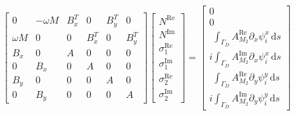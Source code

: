 \documentclass[11pt,a4paper]{article}
\begin{document}
\begin{equation}
\begin{bmatrix}
0 & -\omega M & B_x^T & 0 & B_y^T & 0\\
\omega M & 0 & 0 & B_x^T & 0 & B_y^T\\
B_x & 0 & A & 0 & 0 & 0\\
0 & B_x & 0 & A & 0 & 0\\
B_y & 0 & 0 & 0 & A & 0\\
0 & B_y & 0 & 0 & 0 & A
\end{bmatrix}
\begin{bmatrix}
N^\mathrm{Re}\\
N^\mathrm{Im}\\
\sigma_1^\mathrm{Re}\\
\sigma_1^\mathrm{Im}\\
\sigma_2^\mathrm{Re}\\
\sigma_2^\mathrm{Im}
\end{bmatrix}
=
\begin{bmatrix}
0\\
0\\
\phantom{i}\int_{\Gamma_D}A^\mathrm{Re}_{M_2}\partial_x\psi^x_i\,\mathrm{d}s\\
i\int_{\Gamma_D}A^\mathrm{Im}_{M_2}\partial_x\psi^x_i\,\mathrm{d}s\\
\phantom{i}\int_{\Gamma_D}A^\mathrm{Re}_{M_2}\partial_y\psi^y_i\,\mathrm{d}s\\
i\int_{\Gamma_D}A^\mathrm{Im}_{M_2}\partial_y\psi^y_i\,\mathrm{d}s
\end{bmatrix}
\end{equation}
\end{document}
